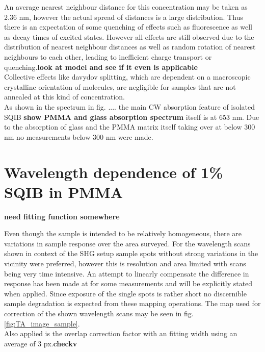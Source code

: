 \documentclass[twoside,openright]{scrreprt}
\begin{document}
An average nearest neighbour distance for this concentration may be taken as 2.36 nm, however the actual spread of distances is a large distribution. Thus there is an expectation of some quenching of effects such as fluorescence as well as decay times of excited states. However all effects are still observed due to the distribution of nearest neighbour distances as well as random rotation of nearest neighbours to each other, leading to inefficient charge transport or quenching.\textbf{look at model and see if it even is applicable}\cite{Zheng2020} \\
Collective effects like davydov splitting, which are dependent on a macroscopic crystalline orientation of molecules, are negligible for samples that are not annealed at this kind of concentration.\\

As shown in the spectrum in fig. .... the main CW absorption feature of isolated SQIB \textbf{show PMMA and glass absorption spectrum} itself is at 653 nm. Due to the absorption of glass and the PMMA matrix itself taking over at below 300 nm no measurements below 300 nm were made.\\

\section{Wavelength dependence of 1\% SQIB in PMMA}

\textbf{need fitting function somewhere}

Even though the sample is intended to be relatively homogeneous, there are variations in sample response over the area surveyed. For the wavelength scans shown in context of the SHG setup sample spots without strong variations in the vicinity were preferred, however this is resolution and area limited with scans being very time intensive. An attempt to linearly compensate the difference in response has been made at for some measurements and will be explicitly stated when applied. Since exposure of the single spots is rather short no discernible sample degradation is expected from these mapping operations. The map used for correction of the shown wavelength scans may be seen in fig. \ref{fig:TA_image_sample}.\\
Also applied is the overlap correction factor with an fitting width using an average of 3 px.\textbf{checkv}
\end{document}
